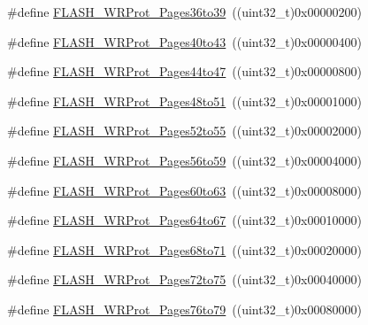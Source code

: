 \begin{DoxyCompactItemize}
\item 
\#define \mbox{\hyperlink{group___option___bytes___write___protection_ga783f47425af52b9a12914520d9ee175e}{F\+L\+A\+S\+H\+\_\+\+W\+R\+Prot\+\_\+\+Pages36to39}}~((uint32\+\_\+t)0x00000200)
\item 
\#define \mbox{\hyperlink{group___option___bytes___write___protection_ga30798723c36db2b8145b6a5c8ffafded}{F\+L\+A\+S\+H\+\_\+\+W\+R\+Prot\+\_\+\+Pages40to43}}~((uint32\+\_\+t)0x00000400)
\item 
\#define \mbox{\hyperlink{group___option___bytes___write___protection_gaa2d897455d5f71c9fd3721d49b3578fc}{F\+L\+A\+S\+H\+\_\+\+W\+R\+Prot\+\_\+\+Pages44to47}}~((uint32\+\_\+t)0x00000800)
\item 
\#define \mbox{\hyperlink{group___option___bytes___write___protection_gac6bb79080cb276b330499f26c706048e}{F\+L\+A\+S\+H\+\_\+\+W\+R\+Prot\+\_\+\+Pages48to51}}~((uint32\+\_\+t)0x00001000)
\item 
\#define \mbox{\hyperlink{group___option___bytes___write___protection_gab5beefbfebf060f71421995f3c7a6418}{F\+L\+A\+S\+H\+\_\+\+W\+R\+Prot\+\_\+\+Pages52to55}}~((uint32\+\_\+t)0x00002000)
\item 
\#define \mbox{\hyperlink{group___option___bytes___write___protection_ga3705c210feeeb63c31976495c0b851f1}{F\+L\+A\+S\+H\+\_\+\+W\+R\+Prot\+\_\+\+Pages56to59}}~((uint32\+\_\+t)0x00004000)
\item 
\#define \mbox{\hyperlink{group___option___bytes___write___protection_ga1978945fc02d1867900f17c4999c50d5}{F\+L\+A\+S\+H\+\_\+\+W\+R\+Prot\+\_\+\+Pages60to63}}~((uint32\+\_\+t)0x00008000)
\item 
\#define \mbox{\hyperlink{group___option___bytes___write___protection_ga124928d6134ddac13e3e8810a0d8dd1a}{F\+L\+A\+S\+H\+\_\+\+W\+R\+Prot\+\_\+\+Pages64to67}}~((uint32\+\_\+t)0x00010000)
\item 
\#define \mbox{\hyperlink{group___option___bytes___write___protection_gafbb813885c6cd505c64083f2f88532fb}{F\+L\+A\+S\+H\+\_\+\+W\+R\+Prot\+\_\+\+Pages68to71}}~((uint32\+\_\+t)0x00020000)
\item 
\#define \mbox{\hyperlink{group___option___bytes___write___protection_ga1a19c52012bbb30f3ae1599fa5a200cc}{F\+L\+A\+S\+H\+\_\+\+W\+R\+Prot\+\_\+\+Pages72to75}}~((uint32\+\_\+t)0x00040000)
\item 
\#define \mbox{\hyperlink{group___option___bytes___write___protection_ga9e1f9abfa57766312c6cbae9b42f3ab6}{F\+L\+A\+S\+H\+\_\+\+W\+R\+Prot\+\_\+\+Pages76to79}}~((uint32\+\_\+t)0x00080000)
\item 

\end{DoxyCompactItemize}
